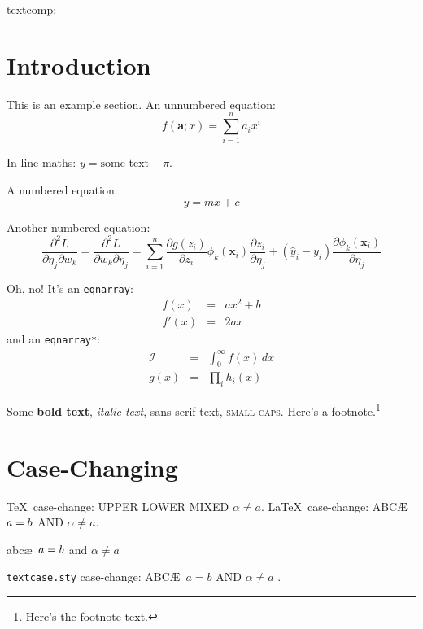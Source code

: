 \documentclass{article}
\newcommand*{\pfrac}[2]{\frac{\partial#1}{\partial#2}}
\newcommand*{\dpfrac}[3]{\frac{\partial^2#1}{\partial#2\partial#3}}
\renewcommand*{\vec}[1]{\boldsymbol{#1}}
\begin{document}


textcomp: \texttwosuperior\ \texteuro

\section{Introduction}
\label{sec:intro}

This is an example section. An unnumbered equation:
\[
  f(\vec{a}; x) = \sum_{i=1}^n a_i x^i
\]

In-line maths: $y = \text{some text} - \pi$.

A numbered equation:
\begin{equation}
y = m x + c
\label{eq:mx+c}
\end{equation}

Another numbered equation:
\begin{equation}\label{eq:dp}
 \dpfrac{L}{\eta_j}{w_k}
 = \dpfrac{L}{w_k}{\eta_j}
 = \sum_{i=1}^n \pfrac{g(z_i)}{z_i}
   \phi_k(\vec{x}_i)\pfrac{z_i}{\eta_j}
 + (\hat{y}_i - y_i)\pfrac{\phi_k(\vec{x}_i)}{\eta_j}
\end{equation}

Oh, no! It's an \texttt{eqnarray}:
\begin{eqnarray}
f(x) &=& ax^2 +b\label{eq:f}\\
f'(x) &=& 2ax\label{eq:df}
\end{eqnarray}
and an \texttt{eqnarray*}:
\begin{eqnarray*}
\mathcal{I} & = & \int_0^\infty f(x)\,dx\\
g(x) & = & \prod_i h_i(x)
\end{eqnarray*}

Some \textbf{bold text}, \textit{italic text}, 
\textsf{sans-serif text}, \textsc{small caps}.
Here's a footnote.\footnote{Here's the footnote text.}

\section{Case-Changing}
\label{sec:casechange}

\TeX\ case-change: \uppercase{upper \lowercase{LOWER} MiXeD $\alpha \neq a$.}
\LaTeX\ case-change: \MakeUppercase{abc\ae\ \protect\( a = b
\protect\) and $\alpha \neq a$}.

{abc\ae\ \protect\( a = b
\protect\) and $\alpha \neq a$}

\texttt{textcase.sty} case-change: \MakeTextUppercase{abc\ae\ \( a = b \) and 
$\alpha \neq a$ }.
\end{document}
